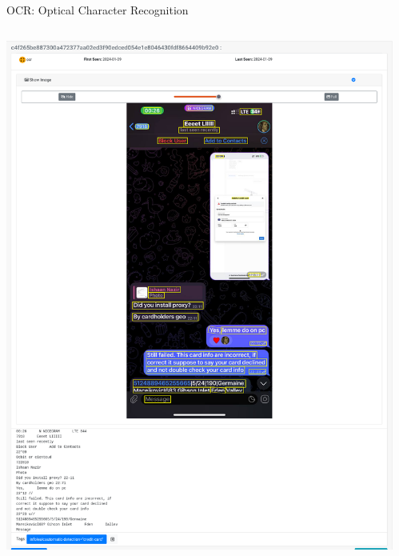 \documentclass[10pt,aspectratio=169, colorlinks=true, linkcolor=circlBlue]{beamer}
\begin{document}

\begin{frame}[fragile]{OCR: Optical Character Recognition}
    \begin{columns}[T,onlytextwidth]
            \centering
            \includegraphics[width=\linewidth]{screenshot/ocr-1.png}
            \begin{itemize}

\end{itemize}
\end{columns}
\end{frame}
\end{document}
